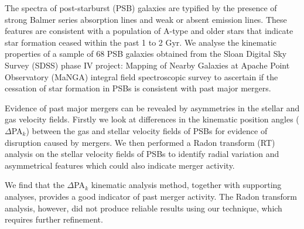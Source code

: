 
The spectra of post-starburst (PSB) galaxies are typified by the presence of strong Balmer series absorption lines and weak or absent emission lines. These features are consistent with a population of A-type and older stars that indicate star formation ceased within the past 1 to 2 Gyr. We analyse the kinematic properties of a sample of 68 PSB galaxies obtained from the Sloan Digital Sky Survey (SDSS) phase IV project: Mapping of Nearby Galaxies at Apache Point Observatory (MaNGA) integral field spectroscopic survey to ascertain if the cessation of star formation in PSBs is consistent with past major mergers. 

Evidence of past major mergers can be revealed by asymmetries in the stellar and gas velocity fields. Firstly we look at differences in the kinematic position angles ($\Delta$PA$_{k}$) between the gas and stellar velocity fields of PSBs for evidence of disruption caused by mergers. We then performed a Radon transform (RT) analysis on the stellar velocity fields of PSBs to identify radial variation and asymmetrical features which could also indicate merger activity. 

We find that the $\Delta$PA$_{k}$ kinematic analysis method, together with supporting analyses, provides a good indicator of past merger activity. The Radon transform analysis, however, did not produce reliable results using our technique, which requires further refinement. 
